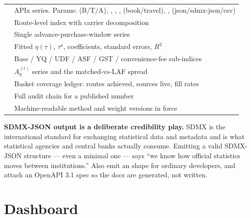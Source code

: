 \begin{center}
\footnotesize
\begin{tabularx}{\textwidth}{@{}L{5.2cm} X@{}}
\toprule
{} &  \\
\midrule
{} & APIx series. Params:  (B/T/A), , , ,  (book/travel), ,  (json/sdmx-json/csv) \\
 & Route-level index with carrier decomposition \\
 & Single advance-purchase-window series \\
 & Fitted $\eta(\tau)$, $\tau^\star$, coefficients, standard errors, $R^2$ \\
 & Base / YQ / UDF / ASF / GST / convenience-fee sub-indices \\
 & $A_g^{(t)}$ series and the matched-vs-LAF spread \\
 & Basket coverage ledger: routes achieved, sources live, fill rates \\
 & Full audit chain for a published number \\
 & Machine-readable method and weight versions in force \\
\bottomrule
\end{tabularx}
\end{center}

\noindent \textbf{SDMX-JSON output is a deliberate credibility play.} SDMX is the
international standard for exchanging statistical data and metadata and is what
statistical agencies and central banks actually consume. Emitting a valid SDMX-JSON
structure --- even a minimal one --- says ``we know how official statistics moves between
institutions.'' Also emit an  shape for ordinary developers, and
attach an OpenAPI 3.1 spec so the docs are generated, not written.

\section{Dashboard}


